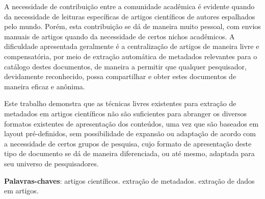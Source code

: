 \documentclass[
	12pt,               %
	openright,          %
	twoside,            %
	a4paper,            %
	english,            %
	brazil              %
	]{abntex2}
\begin{document}
\setlength{\absparsep}{18pt} %
\begin{resumo}


    A necessidade de contribuição entre a comunidade acadêmica é evidente quando da necessidade de leituras específicas de artigos científicos de autores espalhados pelo mundo. Porém, esta contribuição se dá de maneira muito pessoal, com envios manuais de artigos quando da necessidade de certos nichos acadêmicos. A dificuldade apresentada geralmente é a centralização de artigos de maneira livre e compensatória, por meio de extração automática de metadados relevantes para o catálogo destes documentos, de maneira a permitir que qualquer pesquisador, devidamente reconhecido, possa compartilhar e obter estes documentos de maneira eficaz e anônima.

    Este trabalho demonstra que as técnicas livres existentes para extração de metadados em artigos científicos não são suficientes para abranger os diversos formatos existentes de apresentação dos conteúdos, uma vez que são baseados em layout pré-definidos, sem possibilidade de expansão ou adaptação de acordo com a necessidade de certos grupos de pesquisa, cujo formato de apresentação deste tipo de documento se dá de maneira diferenciada, ou até mesmo, adaptada para seu universo de pesquisadores.

    \textbf{Palavras-chaves}: artigos científicos. extração de metadados. extração de dados em artigos.


\end{resumo}
\end{document}
